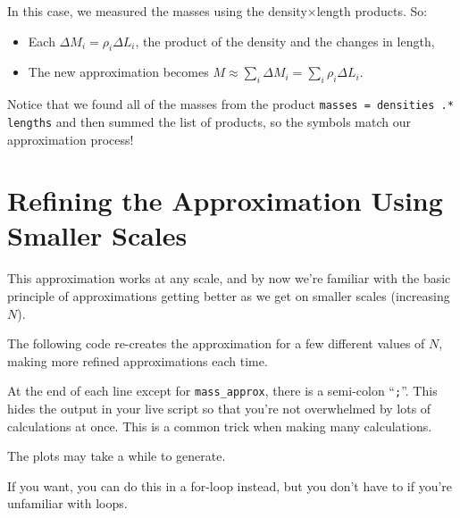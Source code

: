 \documentclass{ximera}
\begin{document}
In this case, we measured the masses using the density$\times$length products. So:
\begin{itemize}
\item Each $\Delta M_i = \rho_i \Delta L_i$, the product of the density and the changes in length,
\item The new approximation becomes $M \approx \sum_i \Delta M_i = \sum_i \rho_i \Delta L_i$.
\end{itemize}

Notice that we found all of the masses from the product \texttt{masses = densities .* lengths} and then summed the list of products, so the symbols match our approximation process!

\section*{Refining the Approximation Using Smaller Scales}

This approximation works at any scale, and by now we're familiar with the basic principle of approximations getting better as we get on smaller scales (increasing $N$).

The following code re-creates the approximation for a few different values of $N$, making more refined approximations each time.

\begin{remark}
At the end of each line except for \texttt{mass\_approx}, there is a semi-colon ``\texttt{;}''. This hides the output in your live script so that you're not overwhelmed by lots of calculations at once. This is a common trick when making many calculations.

The plots may take a while to generate.

If you want, you can do this in a for-loop instead, but you don't have to if you're unfamiliar with loops.
\end{remark}
\end{document}
